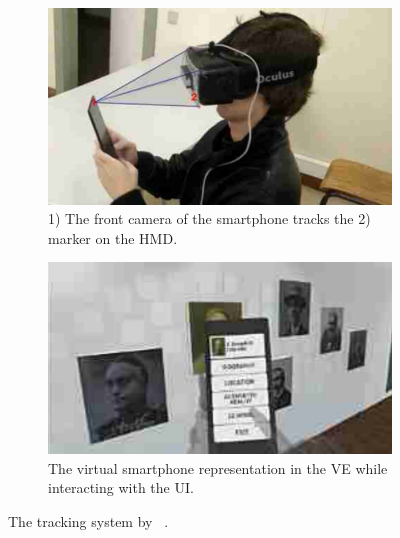\begin{figure}[H]
  \centering
  \begin{subfigure}{0.4\textwidth}%
    \includegraphics[width=\textwidth]{figures/dias_2018_tracking.png}
    \caption{1) The front camera of the smartphone tracks the 2) marker on the \ac{HMD}.}\label{fig:dias-2018-tracking}%
  \end{subfigure}%
  \hspace{0.1\textwidth}%
  \begin{subfigure}{0.4\textwidth}%
    \includegraphics[width=\textwidth]{figures/dias_2018_virtual_smartphone.png}
    \caption{The virtual smartphone representation in the \ac{VE} while interacting with the \ac{UI}.}\label{fig:dias-2018-virtual-smartphone}
  \end{subfigure}%
  \caption[Tracking setup by Dias et al.]{The tracking system by \citeauthor{Dias.2018}~\protect\cite[4,5]{Dias.2018}.}\label{fig:dias-2018}
\end{figure}


